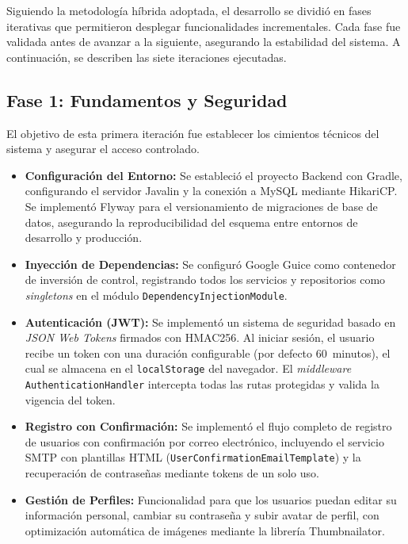 Siguiendo la metodología híbrida adoptada, el desarrollo se dividió en fases iterativas que permitieron desplegar funcionalidades incrementales. Cada fase fue validada antes de avanzar a la siguiente, asegurando la estabilidad del sistema. A continuación, se describen las siete iteraciones ejecutadas.

\subsection{Fase 1: Fundamentos y Seguridad}
El objetivo de esta primera iteración fue establecer los cimientos técnicos del sistema y asegurar el acceso controlado.
\begin{itemize}
    \item \textbf{Configuración del Entorno:} Se estableció el proyecto Backend con Gradle, configurando el servidor Javalin y la conexión a MySQL mediante HikariCP. Se implementó Flyway para el versionamiento de migraciones de base de datos, asegurando la reproducibilidad del esquema entre entornos de desarrollo y producción.
    \item \textbf{Inyección de Dependencias:} Se configuró Google Guice como contenedor de inversión de control, registrando todos los servicios y repositorios como \textit{singletons} en el módulo \texttt{DependencyInjectionModule}.
    \item \textbf{Autenticación (JWT):} Se implementó un sistema de seguridad basado en \textit{JSON Web Tokens} firmados con HMAC256. Al iniciar sesión, el usuario recibe un token con una duración configurable (por defecto 60~minutos), el cual se almacena en el \texttt{localStorage} del navegador. El \textit{middleware} \texttt{AuthenticationHandler} intercepta todas las rutas protegidas y valida la vigencia del token.
    \item \textbf{Registro con Confirmación:} Se implementó el flujo completo de registro de usuarios con confirmación por correo electrónico, incluyendo el servicio SMTP con plantillas HTML (\texttt{UserConfirmationEmailTemplate}) y la recuperación de contraseñas mediante tokens de un solo uso.
    \item \textbf{Gestión de Perfiles:} Funcionalidad para que los usuarios puedan editar su información personal, cambiar su contraseña y subir avatar de perfil, con optimización automática de imágenes mediante la librería Thumbnailator.
\end{itemize}

